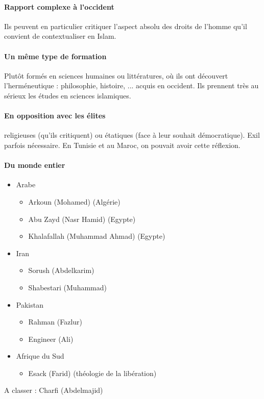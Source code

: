 \paragraph{Rapport complexe à l'occident} Ils peuvent en particulier critiquer l'aspect absolu des droits de l'homme qu'il convient de contextualiser en Islam.

\paragraph{Un même type de formation} Plutôt formés en sciences humaines ou littératures, où ils ont découvert l'herméneutique : philosophie, histoire, ... acquis en occident. Ils prennent très au sérieux les études en sciences islamiques. 

\paragraph{En opposition avec les élites} religieuses (qu'ils critiquent) ou étatiques (face à leur souhait démocratique). Exil parfois nécessaire. En Tunisie et au Maroc, on pouvait avoir cette réflexion.

\paragraph{Du monde entier} 
\begin{itemize}
    \item Arabe
\begin{itemize} 
    \item Arkoun (Mohamed) (Algérie)
    \item Abu Zayd (Nasr Hamid) (Egypte)
    \item Khalafallah (Muhammad Ahmad) (Egypte)
\end{itemize}
\item Iran
\begin{itemize} 
    \item Sorush (Abdelkarim)
    \item Shabestari (Muhammad)
\end{itemize}
\item Pakistan
\begin{itemize} 
    \item Rahman (Fazlur)
    \item Engineer (Ali)
\end{itemize}
\item Afrique du Sud
\begin{itemize} 
    \item Esack (Farid) (théologie de la libération)
\end{itemize}
\end{itemize}
A classer : 
   Charfi
(Abdelmajid) 

